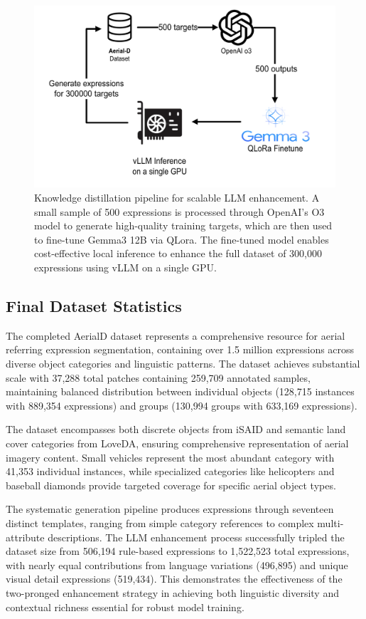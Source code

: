 \begin{figure}[H]
\centering
\includegraphics[width=0.8\columnwidth]{./images/distillation.png}
\caption{Knowledge distillation pipeline for scalable LLM enhancement. A small sample of 500 expressions is processed through OpenAI's O3 model to generate high-quality training targets, which are then used to fine-tune Gemma3 12B via QLora. The fine-tuned model enables cost-effective local inference to enhance the full dataset of 300,000 expressions using vLLM on a single GPU.}
\label{fig:llm_distillation}
\end{figure}

\subsection{Final Dataset Statistics}

The completed AerialD dataset represents a comprehensive resource for aerial referring expression segmentation, containing over 1.5 million expressions across diverse object categories and linguistic patterns. The dataset achieves substantial scale with 37,288 total patches containing 259,709 annotated samples, maintaining balanced distribution between individual objects (128,715 instances with 889,354 expressions) and groups (130,994 groups with 633,169 expressions).

The dataset encompasses both discrete objects from iSAID and semantic land cover categories from LoveDA, ensuring comprehensive representation of aerial imagery content. Small vehicles represent the most abundant category with 41,353 individual instances, while specialized categories like helicopters and baseball diamonds provide targeted coverage for specific aerial object types.

The systematic generation pipeline produces expressions through seventeen distinct templates, ranging from simple category references to complex multi-attribute descriptions. The LLM enhancement process successfully tripled the dataset size from 506,194 rule-based expressions to 1,522,523 total expressions, with nearly equal contributions from language variations (496,895) and unique visual detail expressions (519,434). This demonstrates the effectiveness of the two-pronged enhancement strategy in achieving both linguistic diversity and contextual richness essential for robust model training.

